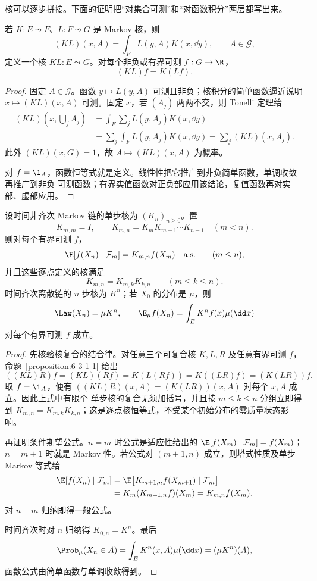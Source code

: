 核可以逐步拼接。下面的证明把“对集合可测”和“对函数积分”两层都写出来。

\begin{proposition}[核的复合]\label{proposition:6-3-1-1}
若 $K:E\leadsto F$、$L:F\leadsto G$ 是 Markov 核，则
\[
 (KL)(x,A)=\int_F L(y,A)K(x,\dd y),\qquad A\in\mathcal G,
\]
定义一个核 $KL:E\leadsto G$。对每个非负或有界可测 $f:G\to\R$，
\[
 (KL)f=K(Lf).
\]
\end{proposition}

\begin{proof}
固定 $A\in\mathcal G$。函数 $y\mapsto L(y,A)$ 可测且非负；核积分的简单函数逼近说明
$x\mapsto(KL)(x,A)$ 可测。固定 $x$，若 $(A_j)$ 两两不交，则 Tonelli 定理给
\begin{align*}
 (KL)\left(x,\bigcup_jA_j\right)
 &=\int_F\sum_jL(y,A_j)K(x,\dd y)\\
 &=\sum_j\int_FL(y,A_j)K(x,\dd y)
 =\sum_j(KL)(x,A_j).
\end{align*}
此外 $(KL)(x,G)=1$，故 $A\mapsto(KL)(x,A)$ 为概率。

对 $f=\1_A$，函数恒等式就是定义。线性性把它推广到非负简单函数，单调收敛再推广到非负
可测函数；有界实值函数对正负部应用该结论，复值函数再对实部、虚部应用。
\end{proof}

\begin{theorem}\label{theorem:6-3-1-2}
设时间非齐次 Markov 链的单步核为 $(K_n)_{n\ge0}$。置
\[
 K_{m,m}=I,\qquad K_{m,n}=K_mK_{m+1}\cdots K_{n-1}\quad(m<n).
\]
则对每个有界可测 $f$，
\[
 \E[f(X_n)\mid\mathcal F_m]=K_{m,n}f(X_m)\quad\text{a.s.}\qquad(m\le n),
\]
并且这些逐点定义的核满足
\[
 K_{m,n}=K_{m,k}K_{k,n}\qquad(m\leq k\leq n).
\]
时间齐次离散链的 $n$ 步核为 $K^n$；若 $X_0$ 的分布是 $\mu$，则
\[
 \Law(X_n)=\mu K^n,
 \qquad
 \E_\mu f(X_n)=\int_EK^nf(x)\mu(\dd x)
\]
对每个有界可测 $f$ 成立。
\end{theorem}

\begin{proof}
先核验核复合的结合律。对任意三个可复合核 $K,L,R$ 及任意有界可测 $f$，
命题~\ref{proposition:6-3-1-1} 给出
\[
 ((KL)R)f=(KL)(Rf)=K(L(Rf))=K((LR)f)=(K(LR))f.
\]
取 $f=\1_A$，便有 $((KL)R)(x,A)=(K(LR))(x,A)$ 对每个 $x,A$ 成立。因此上式中有限个
单步核的复合无须加括号，并且按 $m\le k\le n$ 分组立即得到
$K_{m,n}=K_{m,k}K_{k,n}$；这是逐点核恒等式，不受某个初始分布的零质量状态影响。

再证明条件期望公式。$n=m$ 时公式是适应性给出的
$\E[f(X_m)\mid\mathcal F_m]=f(X_m)$；$n=m+1$ 时就是 Markov 性。若公式对
$(m+1,n)$ 成立，则塔式性质及单步 Markov 等式给
\begin{align*}
 \E[f(X_n)\mid\mathcal F_m]
 &=\E\bigl[K_{m+1,n}f(X_{m+1})\mid\mathcal F_m\bigr]\\
 &=K_m(K_{m+1,n}f)(X_m)=K_{m,n}f(X_m).
\end{align*}
对 $n-m$ 归纳即得一般公式。

时间齐次时对 $n$ 归纳得 $K_{0,n}=K^n$。最后
\[
 \Prob_\mu(X_n\in A)
 =\int_EK^n(x,A)\mu(\dd x)=(\mu K^n)(A),
\]
函数公式由简单函数与单调收敛得到。
\end{proof}

